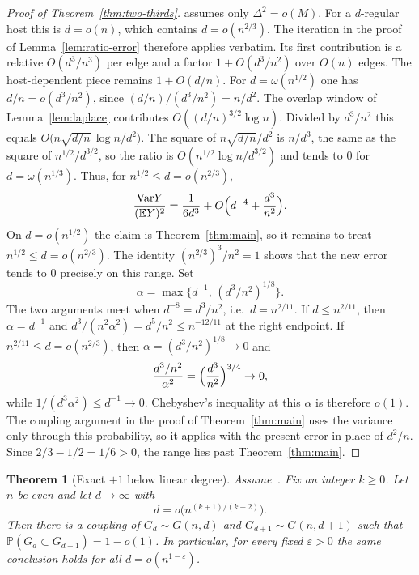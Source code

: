 \documentclass[11pt]{article}
\newtheorem{theorem}{Theorem}
\newcommand{\Gnd}{G(n,d)}
\newcommand{\EE}{\mathbb{E}}
\newcommand{\PP}{\mathbb{P}}
\newcommand{\Var}{\mathrm{Var}}
\begin{document}
\begin{proof}[Proof of Theorem~\ref{thm:two-thirds}]
\cite[Theorem~6]{Gao20} assumes only \(\Delta^2=o(M)\). For a \(d\)-regular host this is \(d=o(n)\), which contains \(d=o(n^{2/3})\).
The iteration in the proof of Lemma~\ref{lem:ratio-error} therefore applies verbatim.
Its first contribution is a relative \(O(d^3/n^3)\) per edge and a factor \(1+O(d^3/n^2)\) over \(O(n)\) edges.
The host-dependent piece remains \(1+O(d/n)\).
For \(d=\omega(n^{1/2})\) one has \(d/n=o(d^3/n^2)\), since \((d/n)/(d^3/n^2)=n/d^2\).
The overlap window of Lemma~\ref{lem:laplace} contributes \(O((d/n)^{3/2}\log n)\).
Divided by \(d^3/n^2\) this equals \(O\bigl(n\sqrt{d/n}\,\log n/d^2\bigr)\).
The square of \(n\sqrt{d/n}/d^2\) is \(n/d^3\), the same as the square of \(n^{1/2}/d^{3/2}\), so the ratio is \(O(n^{1/2}\log n/d^{3/2})\) and tends to \(0\) for \(d=\omega(n^{1/3})\).
Thus, for \(n^{1/2}\le d=o(n^{2/3})\),
\[
\frac{\Var Y}{(\EE Y)^2}
=
\frac1{6d^3}+O\Bigl(d^{-4}+\frac{d^3}{n^2}\Bigr).
\]
On \(d=o(n^{1/2})\) the claim is Theorem~\ref{thm:main}, so it remains to treat \(n^{1/2}\le d=o(n^{2/3})\).
The identity \((n^{2/3})^3/n^2=1\) shows that the new error tends to \(0\) precisely on this range.
Set
\[
\alpha=\max\bigl\{d^{-1},\,(d^3/n^2)^{1/8}\bigr\}.
\]
The two arguments meet when \(d^{-8}=d^3/n^2\), i.e.\ \(d=n^{2/11}\).
If \(d\le n^{2/11}\), then \(\alpha=d^{-1}\) and
\(d^3/(n^2\alpha^2)=d^5/n^2\le n^{-12/11}\) at the right endpoint.
If \(n^{2/11}\le d=o(n^{2/3})\), then \(\alpha=(d^3/n^2)^{1/8}\to 0\) and
\[
\frac{d^3/n^2}{\alpha^2}
=
\Bigl(\frac{d^3}{n^2}\Bigr)^{3/4}\to 0,
\]
while \(1/(d^3\alpha^2)\le d^{-1}\to 0\).
Chebyshev's inequality at this \(\alpha\) is therefore \(o(1)\).
The coupling argument in the proof of Theorem~\ref{thm:main} uses the variance only through this probability, so it applies with the present error in place of \(d^2/n\).
Since \(2/3-1/2=1/6>0\), the range lies past Theorem~\ref{thm:main}.
\end{proof}

\begin{theorem}[Exact \(+1\) below linear degree]
\label{thm:below-linear}
Assume~\cite[Theorem~6]{Gao20}. Fix an integer \(k\ge 0\). Let \(n\) be even and let
\(d\to\infty\) with
\[
d=o\bigl(n^{(k+1)/(k+2)}\bigr).
\]
Then there is a coupling of \(G_d\sim\Gnd\) and \(G_{d+1}\sim G(n,d+1)\) such that
\(\PP(G_d\subset G_{d+1})=1-o(1)\).
In particular, for every fixed \(\varepsilon>0\) the same conclusion holds for all
\(d=o(n^{1-\varepsilon})\).
\end{theorem}
\end{document}
